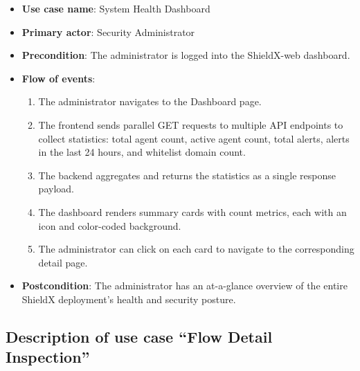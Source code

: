 \documentclass[../Main.tex]{subfiles}
\begin{document}
\begin{itemize}
    \item \textbf{Use case name}: System Health Dashboard
    \item \textbf{Primary actor}: Security Administrator
    \item \textbf{Precondition}: The administrator is logged into the ShieldX-web dashboard.
    \item \textbf{Flow of events}:
        \begin{enumerate}
            \item The administrator navigates to the Dashboard page.
            \item The frontend sends parallel GET requests to multiple API endpoints to collect statistics: total agent count, active agent count, total alerts, alerts in the last 24 hours, and whitelist domain count.
            \item The backend aggregates and returns the statistics as a single response payload.
            \item The dashboard renders summary cards with count metrics, each with an icon and color-coded background.
            \item The administrator can click on each card to navigate to the corresponding detail page.
        \end{enumerate}
    \item \textbf{Postcondition}: The administrator has an at-a-glance overview of the entire ShieldX deployment's health and security posture.
\end{itemize}

\subsection{Description of use case ``Flow Detail Inspection''}
\end{document}

